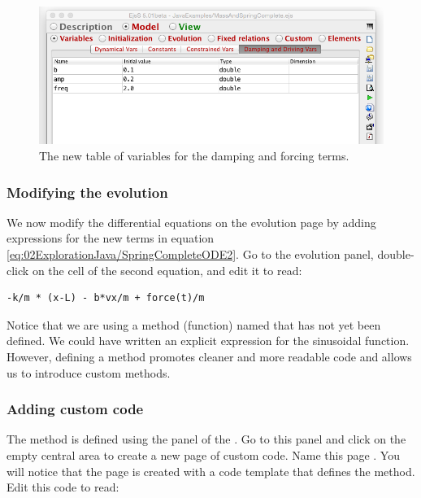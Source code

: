 \begin{figure}[htb]
    \centering
  \includegraphics[scale=\scale]{02ExplorationJava/images/ModifyVariables2.png}
    \caption{The new table of variables for the damping and forcing terms.}
    \label{fig:02ExplorationJava/ModifyVariables2}
\end{figure}

\subsubsection{Modifying the evolution}

We now modify the differential equations on the evolution page by adding expressions for the new terms in equation
\eqref{eq:02ExplorationJava/SpringCompleteODE2}. Go to the evolution panel, double-click on the  cell of the
second equation, and edit it to read:

\begin{listing}
\begin{verbatim}
-k/m * (x-L) - b*vx/m + force(t)/m
\end{verbatim}
\end{listing}
Notice that we are using a method (function) named  that has not yet been defined.
We could have written an explicit expression for the sinusoidal function. However, defining a  method promotes cleaner and more readable code and allows us to introduce custom methods.

\subsubsection{Adding custom code}

The  method is defined using the  panel of the . Go to this panel and click on the
empty central area to create a new page of custom code. Name this page . You will notice that the
page is created with a code template that defines the method. Edit this code to read:

